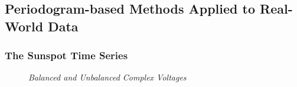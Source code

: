 \documentclass[./main.tex]{subfiles}
\begin{document}
\subsection{Periodogram-based Methods Applied to Real-World Data}

\subsubsection{The Sunspot Time Series}

\begin{figure}[h]
	\centering
	\resizebox{\textwidth}{!}{}
	\caption{\textit{Balanced and Unbalanced Complex Voltages}}
	\label{fig:}
\end{figure}
\end{document}
